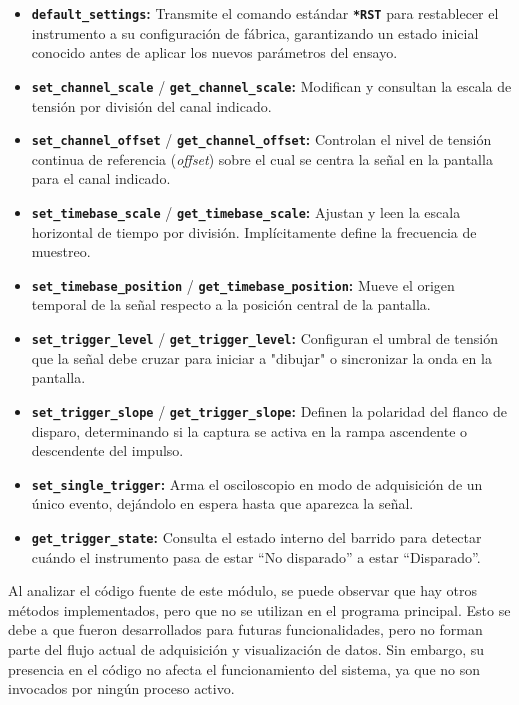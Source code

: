 \begin{itemize}
\item \textbf{\texttt{default\_settings}:} Transmite el comando estándar \textbf{\texttt{*RST}} para restablecer el instrumento a su configuración de fábrica, garantizando un estado inicial conocido antes de aplicar los nuevos parámetros del ensayo.
\item \textbf{\texttt{set\_channel\_scale}} / \textbf{\texttt{get\_channel\_scale}:} Modifican y consultan la escala de tensión por división del canal indicado.
\item \textbf{\texttt{set\_channel\_offset}} / \textbf{\texttt{get\_channel\_offset}:} Controlan el nivel de tensión continua de referencia (\textit{offset}) sobre el cual se centra la señal en la pantalla para el canal indicado.
\item \textbf{\texttt{set\_timebase\_scale}} / \textbf{\texttt{get\_timebase\_scale}:} Ajustan y leen la escala horizontal de tiempo por división. Implícitamente define la frecuencia de muestreo.
\item \textbf{\texttt{set\_timebase\_position}} / \textbf{\texttt{get\_timebase\_position}:} Mueve el origen temporal de la señal respecto a la posición central de la pantalla.
\item \textbf{\texttt{set\_trigger\_level}} / \textbf{\texttt{get\_trigger\_level}:} Configuran el umbral de tensión que la señal debe cruzar para iniciar a "dibujar" o sincronizar la onda en la pantalla.
\item \textbf{\texttt{set\_trigger\_slope}} / \textbf{\texttt{get\_trigger\_slope}:} Definen la polaridad del flanco de disparo, determinando si la captura se activa en la rampa ascendente o descendente del impulso.
\item \textbf{\texttt{set\_single\_trigger}:} Arma el osciloscopio en modo de adquisición de un único evento, dejándolo en espera hasta que aparezca la señal.
\item \textbf{\texttt{get\_trigger\_state}:} Consulta el estado interno del barrido para detectar cuándo el instrumento pasa de estar \enquote{No disparado} a estar \enquote{Disparado}.
\end{itemize}

Al analizar el código fuente de este módulo, se puede observar que hay otros métodos implementados, pero que no se utilizan en el programa principal. Esto se debe a que fueron desarrollados para futuras funcionalidades, pero no forman parte del flujo actual de adquisición y visualización de datos. Sin embargo, su presencia en el código no afecta el funcionamiento del sistema, ya que no son invocados por ningún proceso activo.

